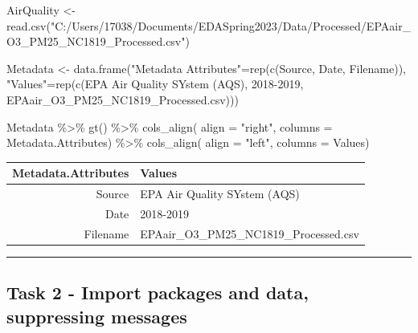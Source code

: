 \documentclass[
]{article}
\newenvironment{Shaded}{\begin{snugshade}}{\end{snugshade}}
\newcommand{\AttributeTok}[1]{\textcolor[rgb]{0.77,0.63,0.00}{#1}}
\newcommand{\FunctionTok}[1]{\textcolor[rgb]{0.00,0.00,0.00}{#1}}
\newcommand{\NormalTok}[1]{#1}
\newcommand{\OtherTok}[1]{\textcolor[rgb]{0.56,0.35,0.01}{#1}}
\newcommand{\SpecialCharTok}[1]{\textcolor[rgb]{0.00,0.00,0.00}{#1}}
\newcommand{\StringTok}[1]{\textcolor[rgb]{0.31,0.60,0.02}{#1}}
\begin{document}
\begin{Shaded}
\begin{Highlighting}[]
\NormalTok{AirQuality }\OtherTok{\textless{}{-}} \FunctionTok{read.csv}\NormalTok{(}\StringTok{"C:/Users/17038/Documents/EDASpring2023/Data/Processed/EPAair\_O3\_PM25\_NC1819\_Processed.csv"}\NormalTok{)}

\NormalTok{Metadata }\OtherTok{\textless{}{-}} \FunctionTok{data.frame}\NormalTok{(}\StringTok{"Metadata Attributes"}\OtherTok{=}\FunctionTok{rep}\NormalTok{(}\FunctionTok{c}\NormalTok{(}\StringTok{\textquotesingle{}Source\textquotesingle{}}\NormalTok{, }\StringTok{\textquotesingle{}Date\textquotesingle{}}\NormalTok{, }\StringTok{\textquotesingle{}Filename\textquotesingle{}}\NormalTok{)), }\StringTok{"Values"}\OtherTok{=}\FunctionTok{rep}\NormalTok{(}\FunctionTok{c}\NormalTok{(}\StringTok{\textquotesingle{}EPA Air Quality SYstem (AQS)\textquotesingle{}}\NormalTok{, }\StringTok{\textquotesingle{}2018{-}2019\textquotesingle{}}\NormalTok{, }\StringTok{\textquotesingle{}EPAair\_O3\_PM25\_NC1819\_Processed.csv\textquotesingle{}}\NormalTok{)))}

\NormalTok{Metadata }\SpecialCharTok{\%\textgreater{}\%}
  \FunctionTok{gt}\NormalTok{() }\SpecialCharTok{\%\textgreater{}\%}
  \FunctionTok{cols\_align}\NormalTok{(}
    \AttributeTok{align =} \StringTok{"right"}\NormalTok{,}
    \AttributeTok{columns =}\NormalTok{ Metadata.Attributes) }\SpecialCharTok{\%\textgreater{}\%}
  \FunctionTok{cols\_align}\NormalTok{(}
    \AttributeTok{align =} \StringTok{"left"}\NormalTok{,}
    \AttributeTok{columns =}\NormalTok{ Values)}
\end{Highlighting}
\end{Shaded}

\begin{longtable}{rl}
\toprule
Metadata.Attributes & Values \\ 
\midrule
Source & EPA Air Quality SYstem (AQS) \\ 
Date & 2018-2019 \\ 
Filename & EPAair\_O3\_PM25\_NC1819\_Processed.csv \\ 
\bottomrule
\end{longtable}

\begin{center}\rule{0.5\linewidth}{0.5pt}\end{center}

\hypertarget{task-2---import-packages-and-data-suppressing-messages}{%
\subsection{Task 2 - Import packages and data, suppressing
messages}\label{task-2---import-packages-and-data-suppressing-messages}}
\end{document}
